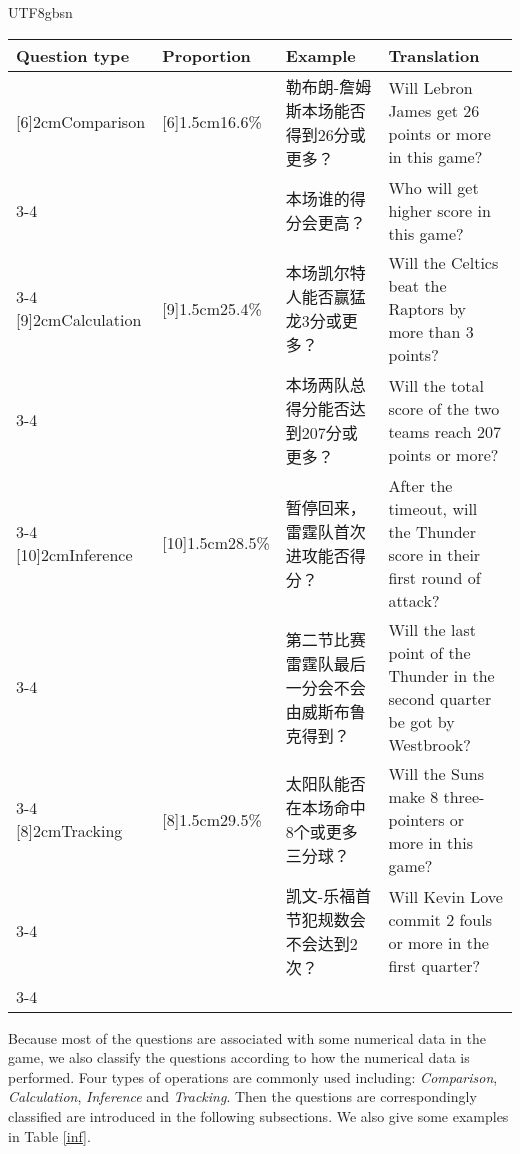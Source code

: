 \begin{CJK}{UTF8}{gbsn}
\begin{table*}[t!]
\centering
\begin{tabular}{|p{2cm}|p{1.5cm}|p{4cm}|p{4.5cm}|}
\hline
Question type&Proportion&Example&Translation\\
\hline
\centering
\multirow{2}[6]{2cm}{Comparison}&
\centering
\multirow{2}[6]{1.5cm}{16.6\%}&
勒布朗-詹姆斯本场能否得到26分或更多？&Will Lebron James get 26 points or more in this game?\\
\cline{3-4}
& &本场谁的得分会更高？&Who will get higher score in this game?\\
\cline{3-4}
\hline
\multirow{2}[9]{2cm}{Calculation}&
\centering
\multirow{2}[9]{1.5cm}{25.4\%}&
本场凯尔特人能否赢猛龙3分或更多？&Will the Celtics beat the Raptors by more than 3 points?\\
\cline{3-4}
& &本场两队总得分能否达到207分或更多？&Will the total score of the two teams reach 207 points or more?\\
\cline{3-4}
\hline
\multirow{2}[10]{2cm}{Inference}&
\centering
\multirow{2}[10]{1.5cm}{28.5\%}&
暂停回来，雷霆队首次进攻能否得分？&After the timeout, will the Thunder score in their first round of attack?\\
\cline{3-4}
& &第二节比赛雷霆队最后一分会不会由威斯布鲁克得到？&Will the last point of the Thunder in the second quarter be got by Westbrook?\\
\cline{3-4}
\hline
\multirow{2}[8]{2cm}{Tracking}&
\centering
\multirow{2}[8]{1.5cm}{29.5\%}&
太阳队能否在本场命中8个或更多三分球？&Will the Suns make 8 three-pointers or more in this game?\\
\cline{3-4}
& &凯文-乐福首节犯规数会不会达到2次？&Will Kevin Love commit 2 fouls or more in the first quarter?\\
\cline{3-4}
\hline
\end{tabular}
\caption{Questions statistics and examples sorted by how the inference process is done.}
\label{inf}
\end{table*}
\end{CJK}

Because most of the questions are associated with some numerical data in the game, we also classify the questions according to how the numerical data is performed. Four types of operations are commonly used including: \textit{Comparison}, \textit{Calculation}, \textit{Inference} and \textit{Tracking}. Then the questions are correspondingly classified are introduced in the following subsections. We also give some examples in Table \ref{inf}.

